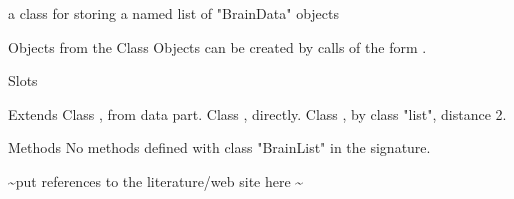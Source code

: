 \begin{Description}\relax
a class for storing a named list of "BrainData" objects
\end{Description}
\begin{Section}{Objects from the Class}
Objects can be created by calls of the form .
\end{Section}
\begin{Section}{Slots}
\end{Section}
\begin{Section}{Extends}
Class , from data part.
Class , directly.
Class , by class "list", distance 2.
\end{Section}
\begin{Section}{Methods}
No methods defined with class "BrainList" in the signature.
\end{Section}
\begin{References}\relax
\textasciitilde{}put references to the literature/web site here \textasciitilde{}
\end{References}

